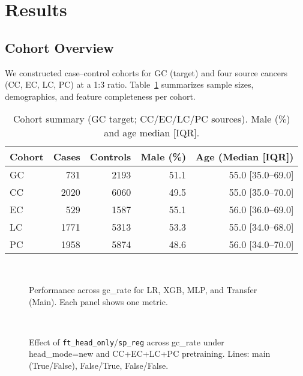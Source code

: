 \documentclass[journal,article,submit,pdftex,moreauthors]{Definitions/mdpi}
\begin{document}
\section{Results}


\subsection{Cohort Overview}
We constructed case--control cohorts for GC (target) and four source cancers (CC, EC, LC, PC) at a 1:3 ratio.
Table~\ref{tab:cohort} summarizes sample sizes, demographics, and feature completeness per cohort.

\begin{table}[H]
\caption{Cohort summary (GC target; CC/EC/LC/PC sources). Male (\%) and age median [IQR].}
\label{tab:cohort}
\centering
\begin{tabular}{lrrrr}
\toprule
Cohort & Cases & Controls & Male (\%) & Age (Median [IQR]) \\
\midrule
GC & 731 & 2193 & 51.1 & 55.0 [35.0–69.0] \\
CC & 2020 & 6060 & 49.5 & 55.0 [35.0–70.0] \\
EC & 529 & 1587 & 55.1 & 56.0 [36.0–69.0] \\
LC & 1771 & 5313 & 53.3 & 55.0 [34.0–68.0] \\
PC & 1958 & 5874 & 48.6 & 56.0 [34.0–70.0] \\
\bottomrule
\end{tabular}

\end{table}

\begin{figure}[H]
\centering
{}
\\
\caption{Performance across gc\_rate for LR, XGB, MLP, and Transfer (Main). Each panel shows one metric.}
\label{fig:model-gcrate}
\end{figure}

\begin{figure}[H]
\centering
{}
\\
\caption{Effect of \texttt{ft\_head\_only}/\texttt{sp\_reg} across gc\_rate under head\_mode=new and CC+EC+LC+PC pretraining. Lines: main (True/False), False/True, False/False.}
\label{fig:transfer-combo-gcrate}
\end{figure}
\end{document}
